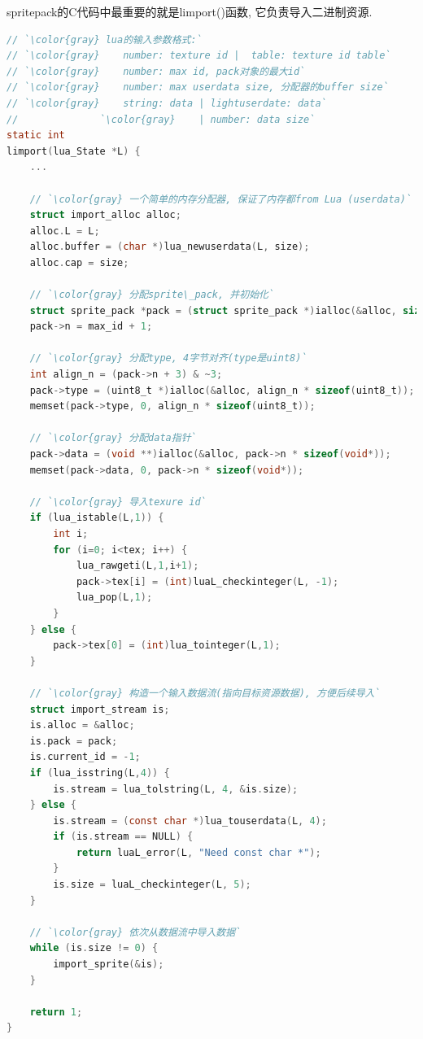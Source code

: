 {spritepack的C代码中最重要的就是limport()函数, 它负责导入二进制资源.}\par
\begin{lstlisting}[language=C]
// `\color{gray} lua的输入参数格式:`
// `\color{gray}    number: texture id |  table: texture id table`
// `\color{gray}    number: max id, pack对象的最大id`
// `\color{gray}    number: max userdata size, 分配器的buffer size`
// `\color{gray}    string: data | lightuserdate: data`
//              `\color{gray}    | number: data size`
static int
limport(lua_State *L) {
    ...

    // `\color{gray} 一个简单的内存分配器, 保证了内存都from Lua (userdata)`
    struct import_alloc alloc;
    alloc.L = L;
    alloc.buffer = (char *)lua_newuserdata(L, size);
    alloc.cap = size;
   
    // `\color{gray} 分配sprite\_pack, 并初始化`
    struct sprite_pack *pack = (struct sprite_pack *)ialloc(&alloc, sizeof(*pack) + (tex - 1) * sizeof(int));
    pack->n = max_id + 1;

    // `\color{gray} 分配type, 4字节对齐(type是uint8)`
    int align_n = (pack->n + 3) & ~3;
    pack->type = (uint8_t *)ialloc(&alloc, align_n * sizeof(uint8_t));
    memset(pack->type, 0, align_n * sizeof(uint8_t));
    
    // `\color{gray} 分配data指针`
    pack->data = (void **)ialloc(&alloc, pack->n * sizeof(void*));
    memset(pack->data, 0, pack->n * sizeof(void*));

    // `\color{gray} 导入texure id`
    if (lua_istable(L,1)) {
        int i;
        for (i=0; i<tex; i++) {
            lua_rawgeti(L,1,i+1);
            pack->tex[i] = (int)luaL_checkinteger(L, -1);
            lua_pop(L,1);
        }
    } else {
        pack->tex[0] = (int)lua_tointeger(L,1);
    }

    // `\color{gray} 构造一个输入数据流(指向目标资源数据), 方便后续导入`
    struct import_stream is;
    is.alloc = &alloc;
    is.pack = pack;
    is.current_id = -1;
    if (lua_isstring(L,4)) {
        is.stream = lua_tolstring(L, 4, &is.size);
    } else {
        is.stream = (const char *)lua_touserdata(L, 4);
        if (is.stream == NULL) {
            return luaL_error(L, "Need const char *");
        }
        is.size = luaL_checkinteger(L, 5);
    }

    // `\color{gray} 依次从数据流中导入数据`
    while (is.size != 0) {
        import_sprite(&is);
    }

    return 1;
}
\end{lstlisting}


